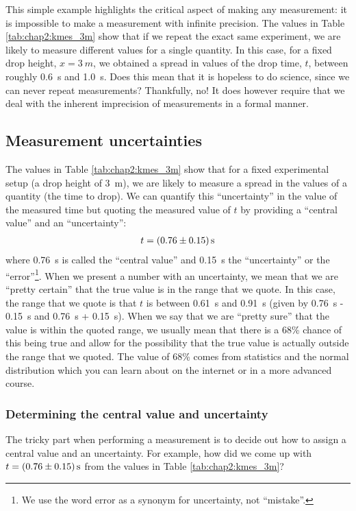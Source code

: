 This simple example highlights the critical aspect of making any measurement: it is impossible to make a measurement with infinite precision. The values in Table \ref{tab:chap2:kmes_3m} show that if we repeat the exact same experiment, we are likely to measure different values for a single quantity. In this case, for a fixed drop height, $x=\SI{3}{m}$, we obtained a spread in values of the drop time, $t$, between roughly \SI{0.6}{s} and \SI{1.0}{s}. Does this mean that it is hopeless to do science, since we can never repeat measurements? Thankfully, no! It does however require that we deal with the inherent imprecision of measurements in a formal manner.

\subsection{Measurement uncertainties}
The values in Table \ref{tab:chap2:kmes_3m} show that for a fixed experimental setup (a drop height of \SI{3}{m}), we are likely to measure a spread in the values of a quantity (the time to drop). We can quantify this ``uncertainty'' in the value of the measured time but quoting the measured value of $t$ by providing a ``central value'' and an ``uncertainty'':
\begin{align*}
t = \SI{0.76 \pm 0.15}{s}
\end{align*}
where \SI{0.76}{s} is called the ``central value'' and \SI{0.15}{s} the ``uncertainty'' or the ``error''\footnote{We use the word error as a synonym for uncertainty, not ``mistake''.}. When we present a number with an uncertainty, we mean that we are ``pretty certain'' that the true value is in the range that we quote. In this case, the range that we quote is that $t$ is between \SI{0.61}{s} and \SI{0.91}{s} (given by \SI{0.76}{s} - \SI{0.15}{s} and \SI{0.76}{s} + \SI{0.15}{s}). When we say that we are ``pretty sure'' that the value is within the quoted range, we usually mean that there is a 68\% chance of this being true and allow for the possibility that the true value is actually outside the range that we quoted. The value of 68\% comes from statistics and the normal distribution which you can learn about on the internet or in a more advanced course. 

\subsubsection{Determining the central value and uncertainty}
The tricky part when performing a measurement is to decide out how to assign a central value and an uncertainty. For example, how did we come up with $t=\SI{0.76 \pm 0.15}{s}$ from the values in Table \ref{tab:chap2:kmes_3m}? 


